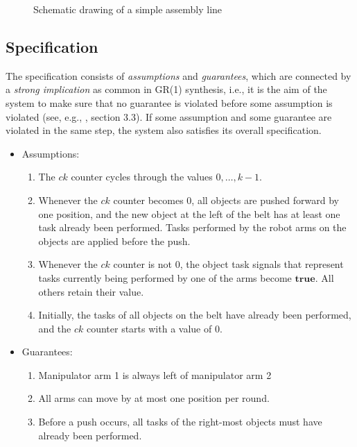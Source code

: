 \documentclass[a4paper,10pt]{IEEEtran}
\begin{document}
\begin{figure}[t]
\caption{Schematic drawing of a simple assembly line}
\label{fig:assemblyLineDrawing}
\end{figure}

\subsection{Specification}
\noindent The specification consists of \emph{assumptions} and \emph{guarantees}, which are connected by a \emph{strong implication} as common in GR(1) synthesis, i.e., it is the aim of the system to make sure that no guarantee is violated before some assumption is violated (see, e.g., \cite{DBLP:journals/jcss/BloemJPPS12}, section 3.3). If some assumption and some guarantee are violated in the same step, the system also satisfies its overall specification.
\begin{itemize}
\item Assumptions:
\begin{enumerate}
\item The $\mathit{ck}$ counter cycles through the values $0, \ldots, k-1$.
\item Whenever the $\mathit{ck}$ counter becomes $0$, all objects are pushed forward by one position, and the new object at the left of the belt has at least one task already been performed. Tasks performed by the robot arms on the objects are applied before the push. \label{item:NoDouble}
\item Whenever the $\mathit{ck}$ counter is not $0$, the object task signals that represent tasks currently being performed by one of the arms become $\mathbf{true}$. All others retain their value.
\item Initially, the tasks of all objects on the belt have already been performed, and the $\mathit{ck}$ counter starts with a value of $0$.
\end{enumerate}
\item Guarantees:
\begin{enumerate}
\item Manipulator arm 1 is always left of manipulator arm 2
\item All arms can move by at most one position per round.
\item Before a push occurs, all tasks of the right-most objects must have already been performed.
\end{enumerate}
\end{itemize}
\end{document}
